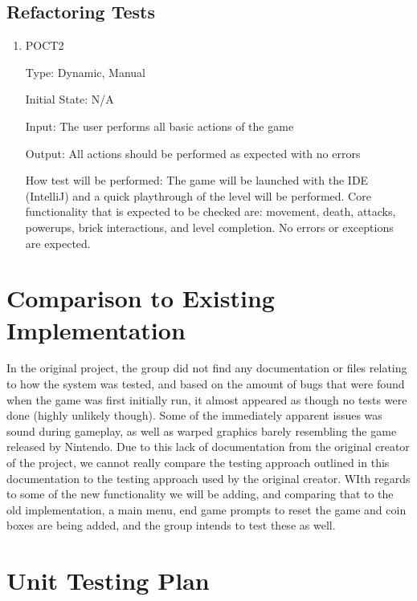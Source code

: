 \documentclass[12pt, titlepage]{article}
\begin{document}
\subsection{Refactoring Tests}

\begin{enumerate}

\item{POCT2\\}

Type: Dynamic, Manual
					
Initial State: N/A
					
Input: The user performs all basic actions of the game
					
Output: All actions should be performed as expected with no errors
					
How test will be performed: The game will be launched with the IDE (IntelliJ) and a quick playthrough of the level will be performed. Core functionality that is expected to be checked are: movement, death, attacks, powerups, brick interactions, and level completion. No errors or exceptions are expected.

\end{enumerate}

	
\section{Comparison to Existing Implementation}	

In the original project, the group did not find any documentation or files relating to how the system was tested, and based on the amount of bugs that were found when the game was first initially run, it almost appeared as though no tests were done (highly unlikely though). Some of the immediately apparent issues was sound during gameplay, as well as warped graphics barely resembling the game released by Nintendo. Due to this lack of documentation from the original creator of the project, we cannot really compare the testing approach outlined in this documentation to the testing approach used by the original creator. WIth regards to some of the new functionality we will be adding, and comparing that to the old implementation, a main menu, end game prompts to reset the game and coin boxes are being added, and the group intends to test these as well.

\section{Unit Testing Plan}
\end{document}
